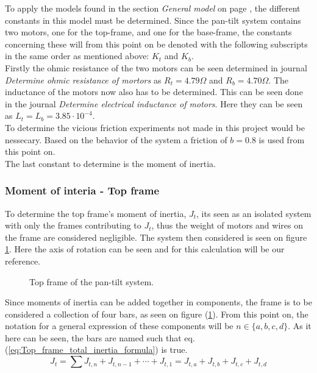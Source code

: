 \documentclass[../../main]{subfiles}
\begin{document}
To apply the models found in the section \textit{General model} on page \pageref{sec:General_model}, the different constants in this model must be determined. Since the pan-tilt system contains two motors, one for the top-frame, and one for the base-frame, the constants concerning these will from this point on be denoted with the following subscripts in the same order as mentioned above: $K_t$ and $K_{b}$.\\
Firstly the ohmic resistance of the two motors can be seen determined in journal \textit{Determine ohmic resistance of mortors} as $R_t = 4.79 \Omega$ and $R_b = 4.70 \Omega$. The inductance of the motors now also has to be determined. This can be seen done in the journal \textit{Determine electrical inductance of motors}. Here they can be seen as $L_t = L_b = 3.85\cdot 10^{-4}$.\\
To determine the vicious friction experiments not made in this project would be nessecary. Based on the behavior of the system a friction of $b = 0.8$ is used from this point on.\\
The last constant to determine is the moment of inertia.

\subsubsection{Moment of interia - Top frame}
\label{ch:Top_frame_inertia}
To determine the top frame's moment of inertia, $J_{t}$, its seen as an isolated system with only the frames contributing to $J_{t}$, thus the weight of motors and wires on the frame are considered negligible. The system then considered is seen on figure \ref{fig:TopFrame}. Here the axis of rotation can be seen and for this calculation will be our reference.\\

\begin{figure}[h]
  \label{fig:TopFrame}
  \centering
  
  \caption{Top frame of the pan-tilt system.}
\end{figure}


Since moments of inertia can be added together in components, the frame is to be considered a collection of four bars, as seen on figure (\ref{fig:TopFrame}). From this point on, the notation for a general expression of these components will be $n \in \{a,b,c,d\}$. As it here can be seen, the bars are named such that eq. (\ref{eq:Top_frame_total_inertia_formula}) is true.
\begin{equation}
  \label{eq:Top_frame_total_inertia_formula}
  J_t = \sum J_{t,n} + J_{t,n-1} + \dotsb + J_{t,1} = J_{t,a} + J_{t,b} + J_{t,c} + J_{t,d}
\end{equation}
\end{document}

